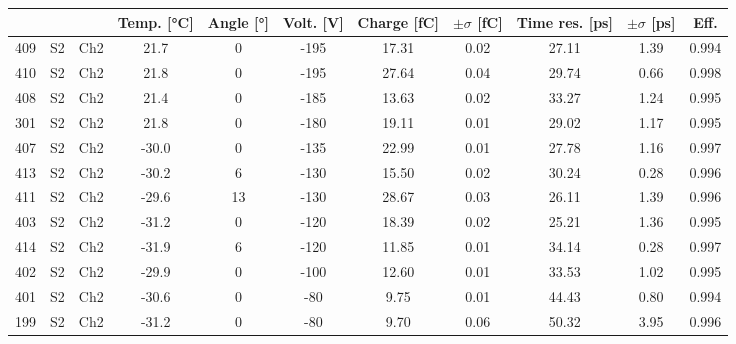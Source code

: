\begin{tabular}{ccccccccccc}
\toprule
 &  &  & Temp. [°C] & Angle [°] & Volt. [V] & Charge [fC] & \(\pm\sigma\) [fC] & Time res. [ps] & \(\pm\sigma\) [ps] & Eff. \\
\midrule
409 & S2 & Ch2 & 21.7 & 0 & -195 & 17.31 & 0.02 & 27.11 & 1.39 & 0.994 \\
410 & S2 & Ch2 & 21.8 & 0 & -195 & 27.64 & 0.04 & 29.74 & 0.66 & 0.998 \\
408 & S2 & Ch2 & 21.4 & 0 & -185 & 13.63 & 0.02 & 33.27 & 1.24 & 0.995 \\
301 & S2 & Ch2 & 21.8 & 0 & -180 & 19.11 & 0.01 & 29.02 & 1.17 & 0.995 \\
407 & S2 & Ch2 & -30.0 & 0 & -135 & 22.99 & 0.01 & 27.78 & 1.16 & 0.997 \\
413 & S2 & Ch2 & -30.2 & 6 & -130 & 15.50 & 0.02 & 30.24 & 0.28 & 0.996 \\
411 & S2 & Ch2 & -29.6 & 13 & -130 & 28.67 & 0.03 & 26.11 & 1.39 & 0.996 \\
403 & S2 & Ch2 & -31.2 & 0 & -120 & 18.39 & 0.02 & 25.21 & 1.36 & 0.995 \\
414 & S2 & Ch2 & -31.9 & 6 & -120 & 11.85 & 0.01 & 34.14 & 0.28 & 0.997 \\
402 & S2 & Ch2 & -29.9 & 0 & -100 & 12.60 & 0.01 & 33.53 & 1.02 & 0.995 \\
401 & S2 & Ch2 & -30.6 & 0 & -80 & 9.75 & 0.01 & 44.43 & 0.80 & 0.994 \\
199 & S2 & Ch2 & -31.2 & 0 & -80 & 9.70 & 0.06 & 50.32 & 3.95 & 0.996 \\
\bottomrule
\end{tabular}
